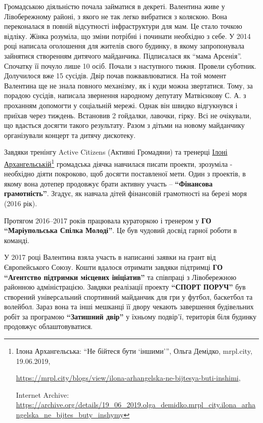 
Громадською діяльністю почала займатися в декреті. Валентина живе у
Лівобережному районі, з якого не так легко вибратися з коляскою. Вона
переконалася в повній відсутності інфраструктури для мам. Це стало точкою
відліку. Жінка розуміла, що зміни потрібні і починати необхідно з себе. У 2014
році написала оголошення для жителів свого будинку, в якому запропонувала
зайнятися створенням дитячого майданчика. Підписалася як \enquote{мама Арсенія}.
Спочатку її почуло лише 10 осіб. Почали з наступного тижня. Провели суботник.
Долучилося вже 15 сусідів. Двір почав пожвавлюватися. На той момент Валентина
ще не знала повного механізму, як і куди можна звертатися. Тому, за порадою
сусідів, написала звернення народному депутату Матвієнкову С. А. з проханням
допомогти у соціальній мережі. Однак він швидко відгукнувся і приїхав через
тиждень. Встановив 2 гойдалки, лавочки, гірку. Всі не очікували, що вдасться
досягти такого результату. Разом з дітьми на новому майданчику організували
концерт та дитячу дискотеку.


Завдяки тренінгу Active Citizens (Активні Громадяни) та тренерці \href{https://archive.org/details/19_06_2019.olga_demidko.mrpl_city.ilona_arhangelska_ne_bijtes_buty_inshymy}{Ілоні
Архангельській}\footnote{%
Ілона Архангельська: \enquote{Не бійтеся бути \enquote{іншими}}, Ольга Демідко, mrpl.city, 19.06.2019, \par%
\url{https://mrpl.city/blogs/view/ilona-arhangelska-ne-bijtesya-buti-inshimi}, \par%
Internet Archive: \url{https://archive.org/details/19_06_2019.olga_demidko.mrpl_city.ilona_arhangelska_ne_bijtes_buty_inshymy}
} громадська діячка навчилася писати проекти, зрозуміла -
необхідно діяти покроково, щоб досягти поставленої мети. Один з проектів, в
якому вона дотепер продовжує брати активну участь – \textbf{\enquote{Фінансова грамотність}}.
Згадує, як навчала дітей фінансовій грамотності на березі моря (2016 рік).

Протягом 2016–2017 років працювала кураторкою і тренером у \textbf{ГО \enquote{Маріупольська
Спілка Молоді}}. Це був чудовий досвід гарної роботи в команді.

У 2017 році Валентина взяла участь в написанні заявки на грант від
Європейського Союзу. Кошти вдалося отримати завдяки підтримці \textbf{ГО \enquote{Агентство
підтримки місцевих ініціатив}} та співпраці з Лівобережною районною
адміністрацією. Завдяки реалізації проекту \textbf{\enquote{СПОРТ ПОРУЧ}} був створений
універсальний спортивний майданчик для гри у футбол, баскетбол та волейбол.
Зараз вона та інші мешканці її двору чекають завершення будівельних робіт за
програмою \textbf{\enquote{Затишний двір}} у їхньому подвір'ї, територія біля будинку продовжує
облаштовуватися.


